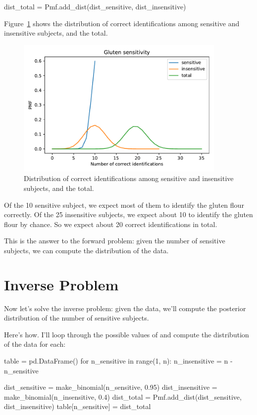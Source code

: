 \documentclass[12pt]{book}
\theoremstyle{exercise}
\begin{document}
\begin{code}
dist_total = Pmf.add_dist(dist_sensitive, dist_insensitive)
\end{code}

Figure~\ref{fig05-02} shows the distribution of correct identifications among sensitive and insensitive subjects, and the total.

\begin{figure}
\centerline{\includegraphics[width=4in]{figs/fig05-02.pdf}}
\caption{Distribution of correct identifications among sensitive and insensitive subjects, and the total.}
\label{fig05-02}
\end{figure}

Of the 10 sensitive subject, we expect most of them to identify the gluten flour correctly.
Of the 25 insensitive subjects, we expect about 10 to identify the gluten flour by chance.
So we expect about 20 correct identifications in total.

This is the answer to the forward problem: given the number of sensitive subjects, we can compute the distribution of the data.

\section{Inverse Problem}

Now let's solve the inverse problem: given the data, we'll compute the posterior distribution of the number of sensitive subjects.

Here's how.  I'll loop through the possible values of  and compute the distribution of the data for each:

\begin{code}
table = pd.DataFrame()
for n_sensitive in range(1, n):
    n_insensitive = n - n_sensitive

    dist_sensitive = make_binomial(n_sensitive, 0.95)
    dist_insensitive = make_binomial(n_insensitive, 0.4)
    dist_total = Pmf.add_dist(dist_sensitive, dist_insensitive)    
    table[n_sensitive] = dist_total
\end{code}
\end{document}
